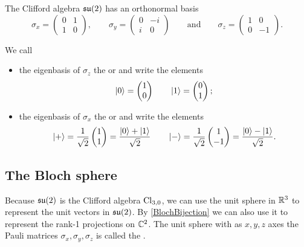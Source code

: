 \begin{proposition}
The Clifford algebra $\operatorname{\mathfrak{su}}(2)$ has an orthonormal basis
\[ \sigma_x = \begin{pmatrix}
0 & 1 \\ 1 & 0
\end{pmatrix}, \qquad \sigma_y = \begin{pmatrix}
0 & -i \\ i & 0
\end{pmatrix} \qquad \text{and}\qquad \sigma_z = \begin{pmatrix}
1 & 0 \\ 0 & -1
\end{pmatrix}. \]
\end{proposition}

\begin{definition}
We call
\begin{itemize}
\item the eigenbasis of $\sigma_z$ the  or  and write the elements
\[ \left| 0 \right\rangle = \begin{pmatrix}
1 \\ 0
\end{pmatrix} \qquad \left| 1 \right\rangle = \begin{pmatrix}
0 \\ 1
\end{pmatrix}; \]
\item the eigenbasis of $\sigma_x$ the  or  and write the elements
\[ \left| + \right\rangle = \frac{1}{\sqrt{2}}\begin{pmatrix}
1 \\ 1
\end{pmatrix} = \frac{\left| 0 \right\rangle + \left| 1 \right\rangle}{\sqrt{2}} \qquad \left| - \right\rangle = \frac{1}{\sqrt{2}}\begin{pmatrix}
1 \\ -1
\end{pmatrix} = \frac{\left| 0 \right\rangle - \left| 1 \right\rangle}{\sqrt{2}}. \]
\end{itemize}
\end{definition}

\subsection{The Bloch sphere}
Because $\operatorname{\mathfrak{su}}(2)$ is the Clifford algebra $\operatorname{Cl}_{3,0}$, we can use the unit sphere in $\mathbb{R}^3$ to represent the unit vectors in $\operatorname{\mathfrak{su}}(2)$. By \ref{BlochBijection} we can also use it to represent the rank-1 projections on $\mathbb{C}^2$. The unit sphere with as $x,y,z$ axes the Pauli matrices $\sigma_x,\sigma_y, \sigma_z$ is called the .

